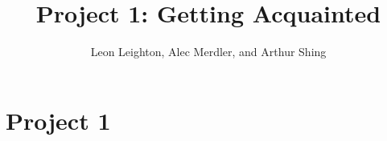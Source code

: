 \documentclass[draftclsnofoot, onecolumn, 10pt]{IEEEtran}
\begin{document}
\title{Project 1: Getting Acquainted}
\author{Leon Leighton, Alec Merdler, and Arthur Shing}

\begin{titlepage}
    \centering
    \maketitle
    \begin{abstract}
    \end{abstract}


\end{titlepage}

\tableofcontents



\section{Project 1}
\end{document}
